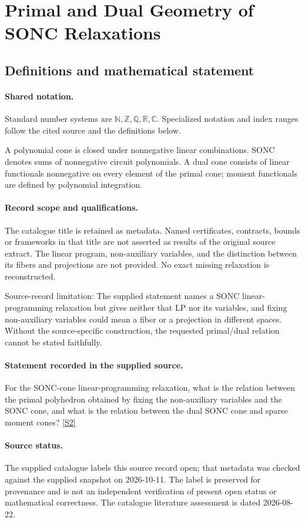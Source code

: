 \documentclass[11pt]{article}
\newcommand{\sref}[2]{\hyperlink{source:#1:#2}{[S#2]}}
\begin{document}
\section{Primal and Dual Geometry of SONC Relaxations}\label{statement}

\subsection{Definitions and mathematical statement}

\paragraph{Shared notation.}Standard number systems are $\mathbb N,\mathbb Z,\mathbb Q,\mathbb R,\mathbb C$. Specialized notation and index ranges follow the cited source and the definitions below.


A polynomial cone is closed under nonnegative linear combinations. SONC denotes sums of nonnegative circuit polynomials. A dual cone consists of linear functionals nonnegative on every element of the primal cone; moment functionals are defined by polynomial integration.
\paragraph{Record scope and qualifications.}
The catalogue title is retained as metadata. Named certificates, contracts, bounds or frameworks in that title are not asserted as results of the original source extract.
The linear program, non-auxiliary variables, and the distinction between its fibers and projections are not provided. No exact missing relaxation is reconstructed.

Source-record limitation: The supplied statement names a SONC linear-programming relaxation but gives neither that LP nor its variables, and fixing non-auxiliary variables could mean a fiber or a projection in different spaces. Without the source-specific construction, the requested primal/dual relation cannot be stated faithfully.
\paragraph{Statement recorded in the supplied source.}
For the SONC-cone linear-programming relaxation, what is the relation between the primal polyhedron obtained by fixing the non-auxiliary variables and the SONC cone, and what is the relation between the dual SONC cone and sparse moment cones? \sref{statement}{2}
\paragraph{Source status.}
The supplied catalogue labels this source record open; that metadata was checked against the supplied snapshot on 2026-10-11. The label is preserved for provenance and is not an independent verification of present open status or mathematical correctness. The catalogue literature assessment is dated 2026-08-22.
\end{document}
